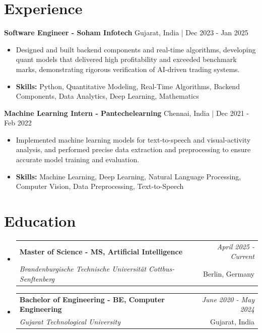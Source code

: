 \documentclass[a4paper,11pt]{article}
\makeatletter
\newcommand{\resumeSubheading}[4]{
\vspace{0.5mm}\item
    \begin{tabular*}{\linewidth}[t]{l@{\extracolsep{\fill}}r}
        \textbf{#1} & \textit{\footnotesize{#4}} \\
        \textit{\footnotesize{#3}} &  \footnotesize{#2}\\
    \end{tabular*}
    \vspace{-2.4mm}
}
\makeatother
\begin{document}
\section{\textbf{Experience}}


\vspace{1mm}
  \textbf{Software Engineer - Soham Infotech} \hfill Gujarat, India | Dec 2023 - Jan 2025
\vspace{-1.5mm} %
\begin{itemize}
  \item Designed and built backend components and real-time algorithms, developing quant models that delivered high profitability and exceeded benchmark marks, demonstrating rigorous verification of AI-driven trading systems.

\vspace{-2mm}
  \item \textbf{Skills:} Python, Quantitative Modeling, Real-Time Algorithms, Backend Components, Data Analytics, Deep Learning, Mathematics
\end{itemize}

\vspace{1mm}
  \textbf{Machine Learning Intern - Pantechelearning} \hfill Chennai, India | Dec 2021 - Feb 2022
\vspace{-1.5mm} %
\begin{itemize}
  \item Implemented machine learning models for text-to-speech and visual-activity analysis, and performed precise data extraction and preprocessing to ensure accurate model training and evaluation.
\vspace{-2mm}
  \item \textbf{Skills:} Machine Learning, Deep Learning, Natural Language Processing, Computer Vision, Data Preprocessing, Text-to-Speech
\end{itemize}\section{\textbf{Education}}
\vspace{-0.4mm}

\begin{itemize}[leftmargin=0.15in, label={}]
\resumeSubheading
{Master of Science - MS, Artificial Intelligence }{Berlin, Germany}
{Brandenburgische Technische Universität Cottbus-Senftenberg  }{April 2025 - Current}

\vspace{1.0mm} %
\resumeSubheading
{Bachelor of Engineering - BE, Computer Engineering  }{Gujarat, India}
{Gujarat Technological University }{June 2020 - May 2024}

\end{itemize}
\end{document}
